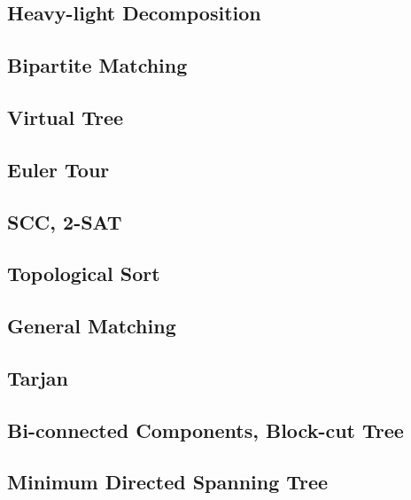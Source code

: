 \subsection{Heavy-light Decomposition}
\raggedbottom
\hrulefill
\subsection{Bipartite Matching}
\raggedbottom
\hrulefill
\subsection{Virtual Tree}
\raggedbottom
\hrulefill
\subsection{Euler Tour}
\raggedbottom
\hrulefill
\subsection{SCC, 2-SAT}
\raggedbottom
\hrulefill
\subsection{Topological Sort}
\raggedbottom
\hrulefill
\subsection{General Matching}
\raggedbottom
\hrulefill
\subsection{Tarjan}
\raggedbottom
\hrulefill
\subsection{Bi-connected Components, Block-cut Tree}
\raggedbottom
\hrulefill
\subsection{Minimum Directed Spanning Tree}
\raggedbottom
\hrulefill
